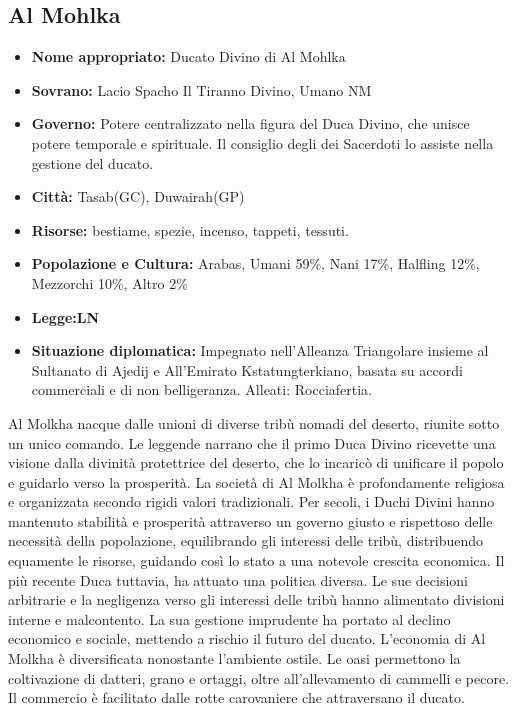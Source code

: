 \documentclass[a4paper]{report}
\begin{document}
\begin{multicols}{2}
\subsection*{Al Mohlka}
\begin{itemize}
	\item \textbf{Nome appropriato:} Ducato Divino di Al Mohlka
	\item \textbf{Sovrano: }Lacio Spacho Il Tiranno Divino, Umano NM
	\item \textbf{Governo: }Potere centralizzato nella figura del Duca Divino, che unisce potere temporale e spirituale. Il consiglio degli dei Sacerdoti lo assiste nella gestione del ducato.
	\item \textbf{Città: }Tasab(GC), Duwairah(GP)
	\item \textbf{Risorse:}  bestiame, spezie, incenso, tappeti, tessuti.
	\item \textbf{Popolazione e Cultura:} Arabas, Umani 59\%, Nani 17\%, Halfling 12\%, Mezzorchi 10\%, Altro 2\% 
	\item \textbf{Legge:LN}
	\item \textbf{Situazione diplomatica: }Impegnato nell'Alleanza Triangolare insieme al Sultanato di Ajedij e All'Emirato Kstatungterkiano, basata su accordi commerciali e di non belligeranza. Alleati: Rocciafertia.
\end{itemize}
Al Molkha nacque dalle unioni di diverse tribù nomadi del deserto, riunite sotto un unico comando. Le leggende narrano che il primo Duca Divino ricevette una visione dalla divinità protettrice del deserto, che lo incaricò di unificare il popolo e guidarlo verso la prosperità.  La società di Al Molkha è profondamente religiosa e organizzata secondo rigidi valori tradizionali. Per secoli, i Duchi Divini hanno mantenuto stabilità e prosperità attraverso un governo giusto e rispettoso delle necessità della popolazione, equilibrando gli interessi delle tribù, distribuendo equamente le risorse, guidando così lo stato a una notevole crescita economica.
Il più recente Duca tuttavia, ha attuato una politica diversa. Le sue decisioni arbitrarie e la negligenza verso gli interessi delle tribù hanno alimentato divisioni interne e malcontento. La sua gestione imprudente ha portato al declino economico e sociale, mettendo a rischio il futuro del ducato. 
L'economia di Al Molkha è diversificata nonostante l'ambiente ostile. Le oasi permettono la coltivazione di datteri, grano e ortaggi, oltre all'allevamento di cammelli e pecore. Il commercio è facilitato dalle rotte carovaniere che attraversano il ducato.


\end{multicols}
\end{document}
